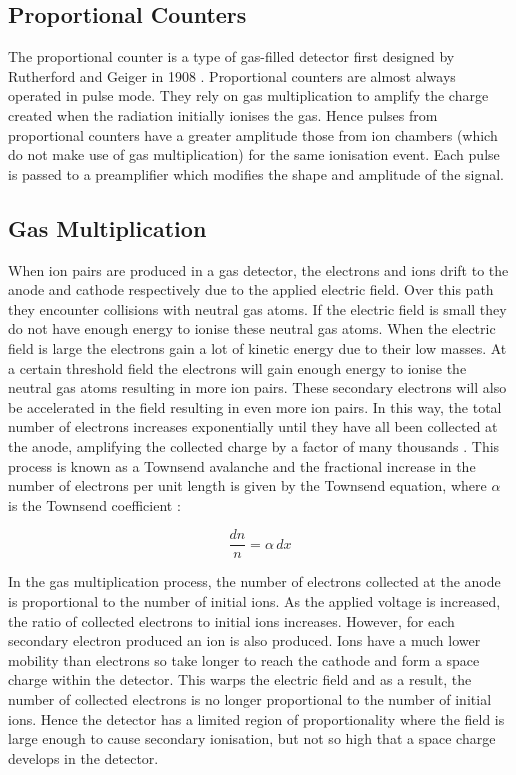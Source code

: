\subsection{Proportional Counters}

The proportional counter is a type of gas-filled detector first designed by Rutherford and Geiger in 1908 \cite{original_design}. Proportional counters are almost always operated in pulse mode. They rely on gas multiplication to amplify the charge created when the radiation initially ionises the gas. Hence pulses from proportional counters have a greater amplitude those from ion chambers (which do not make use of gas multiplication) for the same ionisation event. Each pulse is passed to a preamplifier which modifies the shape and amplitude of the signal.

\subsection{Gas Multiplication}

When ion pairs are produced in a gas detector, the electrons and ions drift to the anode and cathode respectively due to the applied electric field. Over this path they encounter collisions with neutral gas atoms. If the electric field is small they do not have enough energy to ionise these neutral gas atoms. When the electric field is large the electrons gain a lot of kinetic energy due to their low masses. At a certain threshold field the electrons will gain enough energy to ionise the neutral gas atoms resulting in more ion pairs. These secondary electrons will also be accelerated in the field resulting in even more ion pairs. In this way, the total number of electrons increases exponentially until they have all been collected at the anode, amplifying the collected charge by a factor of many thousands \cite{gas_multiplication}. This process is known as a Townsend avalanche and the fractional increase in the number of electrons per unit length is given by the Townsend equation, where $\alpha$ is the Townsend coefficient \cite{knoll_book}:

\begin{equation}
\frac{dn}{n} = \alpha\,dx
\end{equation}

In the gas multiplication process, the number of electrons collected at the anode is proportional to the number of initial ions. As the applied voltage is increased, the ratio of collected electrons to initial ions increases. However, for each secondary electron produced an ion is also produced. Ions have a much lower mobility than electrons so take longer to reach the cathode and form a space charge within the detector. This warps the electric field and as a result, the number of collected electrons is no longer proportional to the number of initial ions. Hence the detector has a limited region of proportionality where the field is large enough to cause secondary ionisation, but not so high that a space charge develops in the detector.

